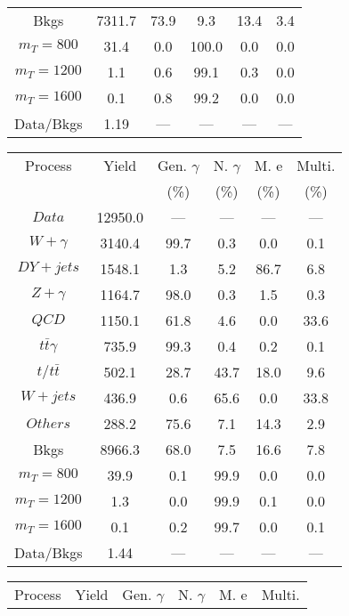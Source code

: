 \begin{figure}
\begin{minipage}[c]{0.32\textwidth}
{\begin{tabular}{cccccc}
Bkgs &  7311.7 &  73.9 &  9.3 &  13.4 &  3.4\\
$ m_{T} = 800 $ &  31.4 &  0.0 &  100.0 &  0.0 &  0.0\\
$ m_{T} = 1200 $ &  1.1 &  0.6 &  99.1 &  0.3 &  0.0\\
$ m_{T} = 1600 $ &  0.1 &  0.8 &  99.2 &  0.0 &  0.0\\
Data/Bkgs &  1.19 &  --- &  --- &  --- &  ---\\
\hline
\end{tabular}
}
\end{minipage}
\begin{minipage}[c]{0.32\textwidth}
\centering
\tiny{
\begin{tabular}{cccccc}
\hline
Process & Yield & Gen. $\gamma$ & N. $\gamma$ & M. e & Multi. \\
 &  & (\%) & (\%) & (\%) & (\%)  \\
\hline
                                                                      $ Data $ &  12950.0 &  --- &  --- &  --- &  ---\\
$ W+\gamma $ &  3140.4 &  99.7 &  0.3 &  0.0 &  0.1\\
$ DY+jets $ &  1548.1 &  1.3 &  5.2 &  86.7 &  6.8\\
$ Z+\gamma $ &  1164.7 &  98.0 &  0.3 &  1.5 &  0.3\\
$ QCD $ &  1150.1 &  61.8 &  4.6 &  0.0 &  33.6\\
$ t\bar{t}\gamma $ &  735.9 &  99.3 &  0.4 &  0.2 &  0.1\\
$ t/t\bar{t} $ &  502.1 &  28.7 &  43.7 &  18.0 &  9.6\\
$ W+jets $ &  436.9 &  0.6 &  65.6 &  0.0 &  33.8\\
$ Others $ &  288.2 &  75.6 &  7.1 &  14.3 &  2.9\\
Bkgs &  8966.3 &  68.0 &  7.5 &  16.6 &  7.8\\
$ m_{T} = 800 $ &  39.9 &  0.1 &  99.9 &  0.0 &  0.0\\
$ m_{T} = 1200 $ &  1.3 &  0.0 &  99.9 &  0.1 &  0.0\\
$ m_{T} = 1600 $ &  0.1 &  0.2 &  99.7 &  0.0 &  0.1\\
Data/Bkgs &  1.44 &  --- &  --- &  --- &  ---\\
\hline
\end{tabular}
}
\end{minipage}
\begin{minipage}[c]{0.32\textwidth}
\centering
\tiny{
\begin{tabular}{cccccc}
\hline
Process & Yield & Gen. $\gamma$ & N. $\gamma$ & M. e & Multi. \\

\end{tabular}}
\end{minipage}
\end{figure}
